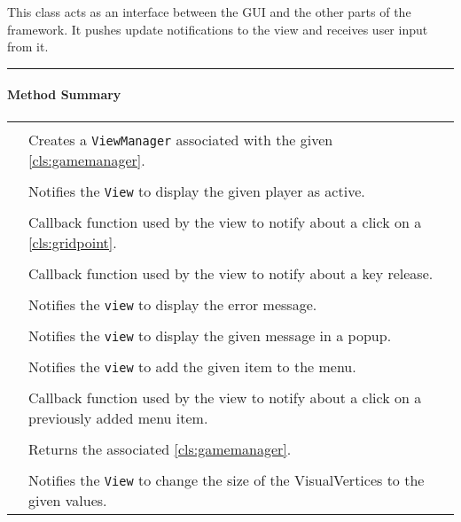 This class acts as an interface between the \gls{GUI} and the other parts of the \gls{framework}. It pushes update notifications to the view and receives user input from it.  \\

\vspace{.5cm}
\hrule

\paragraph*{Method Summary}
\paragraph*{}
\begin{longtable}{Lp{10cm}}
	\startmethodtable
	 \\
	& Creates a \texttt{ViewManager} associated with the given \ref{cls:gamemanager}. \\
	 \\
	& Notifies the \texttt{View} to display the given player as active. \\
	 \\
	& Callback function used by the view to notify about a click on a \ref{cls:gridpoint}.  \\
	 \\
	& Callback function used by the view to notify about a key release. \\
	 \\
	& Notifies the \texttt{view} to display the error message. \\
	 \\
	& Notifies the \texttt{view} to display the given message in a popup. \\
	 \\
	& Notifies the \texttt{view} to add the given item to the menu. \\
	 \\
	& Callback function used by the view to notify about a click on a previously added menu item.  \\
	 \\
	& Returns the associated \ref{cls:gamemanager}. \\
	 \\
	& Notifies the \texttt{View} to change the size of the VisualVertices to the given values. \\


\end{longtable}
